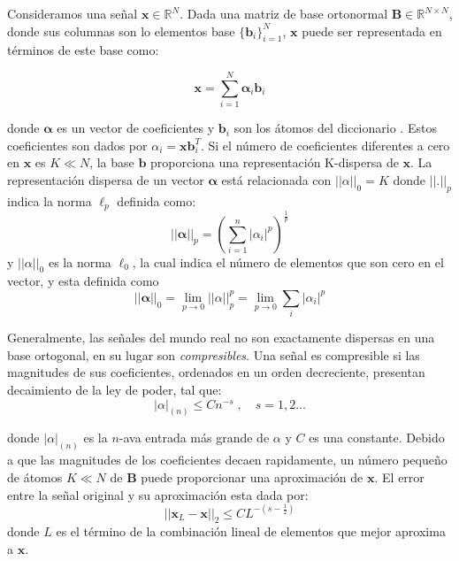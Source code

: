 Consideramos una se\~nal $\boldsymbol{x} \in \mathbb{R}^N$. Dada una matriz de base ortonormal $\boldsymbol{B} \in \mathbb{R}^{N \times N}$, donde sus columnas son lo elementos base $ \{\boldsymbol{b}_i\}_{i=1}^N$, $\boldsymbol{x}$ puede ser representada en t\'erminos de este base como:
\begin{center}
\begin{equation}
\boldsymbol{x}=\sum \limits_{i=1}^{N} \boldsymbol{\alpha}_i \boldsymbol{b}_i
\end{equation}
\end{center}
donde $\boldsymbol{\alpha}$ es un vector de coeficientes  y $\boldsymbol{b}_i$ son los \'atomos del diccionario \cite{sparsity}. Estos coeficientes son dados por $\alpha_i = \boldsymbol{x} \boldsymbol{b}_i^T$. Si el n\'umero de coeficientes diferentes a cero en $\boldsymbol{x}$ es $K\ll N$, la base $\boldsymbol{b}$ proporciona una representaci\'on K-dispersa de $\boldsymbol{x}$. La representaci\'on dispersa de un vector $\boldsymbol{\alpha}$ est\'a relacionada con $||\alpha||_0 = K$ donde $||.||_p$ indica la norma $\ell_p$ definida como:
\begin{equation}
||\boldsymbol{\alpha}||_p = \left(\sum\limits_{i=1}^{n} |\alpha_i|^p \right)^\frac{1}{p}
\end{equation}
y $||\alpha||_0$ es la norma $\ell_0$, la cual indica el n\'umero de elementos que son cero en el vector, y esta definida como
\begin{equation}
||\boldsymbol{\alpha}||_0 = \lim_{p \to 0} ||\alpha||_p^p=\lim_{p \to 0} \sum_i |\alpha_i|^p
\end{equation} 

Generalmente, las se\~nales del mundo real no son exactamente dispersas en una base ortogonal, en su lugar son \emph{compresibles}. Una se\~nal es compresible si las magnitudes de sus coeficientes, ordenados en un orden decreciente, presentan decaimiento de la ley de poder, tal que:
\begin{equation}
|\alpha|_{(n)} \leq C n^{-s}\;,\quad s=1,2 \ldots
\end{equation}

donde $|\alpha|_{(n)}$ es la $n$-ava entrada m\'as grande de  $\alpha$ y $C$ es una constante. Debido a que las magnitudes de los coeficientes decaen rapidamente, un n\'umero peque\~no de \'atomos $K\ll N$ de $\boldsymbol{B}$ puede proporcionar una aproximaci\'on de $\boldsymbol{x}$. El error entre la se\~nal original y su aproximaci\'on esta dada por:
\begin{equation}
||\boldsymbol{x}_L - \boldsymbol{x}||_2 \leq CL^{-(s-\frac{1}{2})}
\end{equation}
donde $L$ es el t\'ermino de la combinaci\'on lineal de elementos que mejor aproxima a $\boldsymbol{x}$.  

